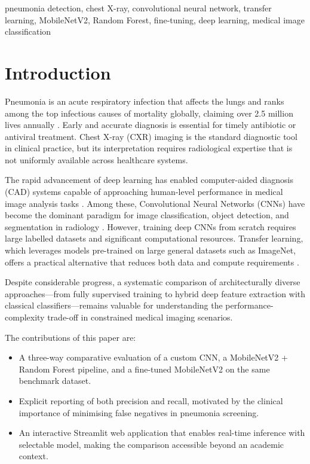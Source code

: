 \documentclass[conference]{IEEEtran}
\begin{document}
\begin{IEEEkeywords}
pneumonia detection, chest X-ray, convolutional neural network,
transfer learning, MobileNetV2, Random Forest, fine-tuning,
deep learning, medical image classification
\end{IEEEkeywords}

\section{Introduction}

Pneumonia is an acute respiratory infection that affects the
lungs and ranks among the top infectious causes of mortality
globally, claiming over 2.5 million lives annually \cite{who2019}.
Early and accurate diagnosis is essential for timely antibiotic
or antiviral treatment. Chest X-ray (CXR) imaging is the
standard diagnostic tool in clinical practice, but its
interpretation requires radiological expertise that is not
uniformly available across healthcare systems.

The rapid advancement of deep learning has enabled
computer-aided diagnosis (CAD) systems capable of approaching
human-level performance in medical image analysis tasks
\cite{rajpurkar2017}. Among these, Convolutional Neural Networks
(CNNs) have become the dominant paradigm for image classification,
object detection, and segmentation in radiology \cite{litjens2017}.
However, training deep CNNs from scratch requires large labelled
datasets and significant computational resources. Transfer
learning, which leverages models pre-trained on large general
datasets such as ImageNet, offers a practical alternative that
reduces both data and compute requirements \cite{pan2010}.

Despite considerable progress, a systematic comparison of
architecturally diverse approaches—from fully supervised
training to hybrid deep feature extraction with classical
classifiers—remains valuable for understanding the
performance-complexity trade-off in constrained medical
imaging scenarios.

The contributions of this paper are:
\begin{itemize}
  \item A three-way comparative evaluation of a custom CNN,
        a MobileNetV2 + Random Forest pipeline, and a
        fine-tuned MobileNetV2 on the same benchmark dataset.
  \item Explicit reporting of both precision and recall,
        motivated by the clinical importance of minimising
        false negatives in pneumonia screening.
  \item An interactive Streamlit web application that
        enables real-time inference with selectable model,
        making the comparison accessible beyond an
        academic context.
\end{itemize}
\end{document}
